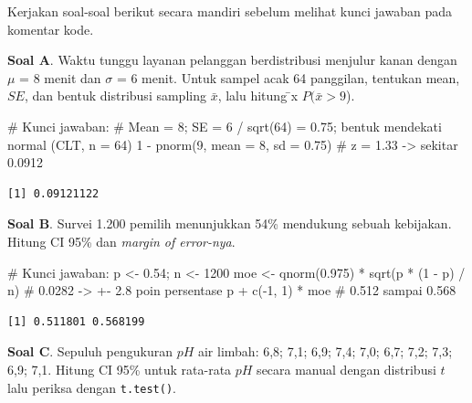 \documentclass[
  indonesian,
  letterpaper,
]{book}
\newenvironment{Shaded}{\begin{snugshade}}{\end{snugshade}}
\newcommand{\AttributeTok}[1]{\textcolor[rgb]{0.40,0.45,0.13}{#1}}
\newcommand{\CommentTok}[1]{\textcolor[rgb]{0.37,0.37,0.37}{#1}}
\newcommand{\DecValTok}[1]{\textcolor[rgb]{0.68,0.00,0.00}{#1}}
\newcommand{\FloatTok}[1]{\textcolor[rgb]{0.68,0.00,0.00}{#1}}
\newcommand{\FunctionTok}[1]{\textcolor[rgb]{0.28,0.35,0.67}{#1}}
\newcommand{\NormalTok}[1]{\textcolor[rgb]{0.00,0.23,0.31}{#1}}
\newcommand{\OtherTok}[1]{\textcolor[rgb]{0.00,0.23,0.31}{#1}}
\newcommand{\SpecialCharTok}[1]{\textcolor[rgb]{0.37,0.37,0.37}{#1}}
\begin{document}
Kerjakan soal-soal berikut secara mandiri sebelum melihat kunci jawaban
pada komentar kode.

\textbf{Soal A}. Waktu tunggu layanan pelanggan berdistribusi menjulur
kanan dengan \(\mu\) = 8 menit dan \(\sigma\) = 6 menit. Untuk sampel
acak 64 panggilan, tentukan mean, \(SE\), dan bentuk distribusi sampling
\(\bar{x}\), lalu hitung ̄x \(P(\bar{x} > 9\)).

\begin{Shaded}
\begin{Highlighting}[]
\CommentTok{\# Kunci jawaban:}
\CommentTok{\# Mean = 8; SE = 6 / sqrt(64) = 0.75; bentuk mendekati normal (CLT, n = 64)}
\DecValTok{1} \SpecialCharTok{{-}} \FunctionTok{pnorm}\NormalTok{(}\DecValTok{9}\NormalTok{, }\AttributeTok{mean =} \DecValTok{8}\NormalTok{, }\AttributeTok{sd =} \FloatTok{0.75}\NormalTok{) }\CommentTok{\# z = 1.33 {-}\textgreater{} sekitar 0.0912}
\end{Highlighting}
\end{Shaded}

\begin{verbatim}
[1] 0.09121122
\end{verbatim}

\textbf{Soal B}. Survei 1.200 pemilih menunjukkan 54\% mendukung sebuah
kebijakan. Hitung CI 95\% dan \emph{margin of error-nya}.

\begin{Shaded}
\begin{Highlighting}[]
\CommentTok{\# Kunci jawaban:}
\NormalTok{p }\OtherTok{\textless{}{-}} \FloatTok{0.54}\NormalTok{; n }\OtherTok{\textless{}{-}} \DecValTok{1200}
\NormalTok{moe }\OtherTok{\textless{}{-}} \FunctionTok{qnorm}\NormalTok{(}\FloatTok{0.975}\NormalTok{) }\SpecialCharTok{*} \FunctionTok{sqrt}\NormalTok{(p }\SpecialCharTok{*}\NormalTok{ (}\DecValTok{1} \SpecialCharTok{{-}}\NormalTok{ p) }\SpecialCharTok{/}\NormalTok{ n) }\CommentTok{\# 0.0282 {-}\textgreater{} +{-} 2.8 poin persentase}
\NormalTok{p }\SpecialCharTok{+} \FunctionTok{c}\NormalTok{(}\SpecialCharTok{{-}}\DecValTok{1}\NormalTok{, }\DecValTok{1}\NormalTok{) }\SpecialCharTok{*}\NormalTok{ moe }\CommentTok{\# 0.512 sampai 0.568}
\end{Highlighting}
\end{Shaded}

\begin{verbatim}
[1] 0.511801 0.568199
\end{verbatim}

\textbf{Soal C}. Sepuluh pengukuran \(pH\) air limbah: 6,8; 7,1; 6,9;
7,4; 7,0; 6,7; 7,2; 7,3; 6,9; 7,1. Hitung CI 95\% untuk rata-rata \(pH\)
secara manual dengan distribusi \(t\) lalu periksa dengan
\texttt{t.test()}.
\end{document}
